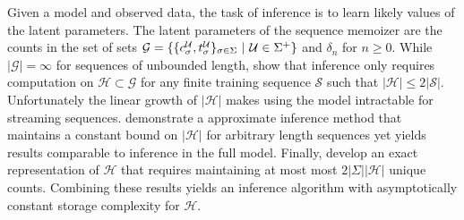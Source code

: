 
Given a model and observed data,  the task of inference is to learn likely values of the latent parameters.  The latent parameters of the sequence memoizer are the counts in the set of sets  $\mathcal{G} = \{ \{ c^\U_\sigma, t^\U_\sigma \}_{\sigma \in \Sigma} \ | \ \U \in \Sigma^{+} \}$  and $\delta_n$ for $n \geq 0$.  While $| \mathcal{G}| = \infty$ for sequences of unbounded length, \citep{Wood2009} show that inference only requires computation on $\mathcal{H} \subset \mathcal{G}$ for any finite training sequence $\mathcal{S}$ such that $|\mathcal{H} | \leq 2 |\mathcal{S}|$.  
Unfortunately the linear growth of $|\mathcal{H}|$ makes using the model intractable for streaming sequences. \citep{Bartlett2010} demonstrate a approximate inference method that maintains a constant bound on $|\mathcal{H}| $ for arbitrary length sequences yet yields results comparable to inference in the full model.  Finally, \cite{Gasthaus2011} develop an exact representation of $\mathcal{H}$ that requires maintaining at most most $2|\Sigma| |\mathcal{H}|$ unique counts. Combining these results yields an inference algorithm with asymptotically constant storage complexity for $\mathcal{H}$.  


